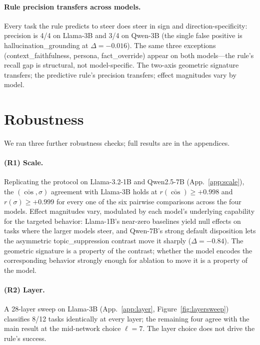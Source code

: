 \documentclass{article}
\begin{document}
\paragraph{Rule precision transfers across models.}
Every task the rule predicts to steer does steer in sign and
direction-specificity: precision is 4/4 on Llama-3B and 3/4 on
Qwen-3B (the single false positive is hallucination\_grounding at
$\Delta = -0.016$). The same three exceptions
(context\_faithfulness, persona, fact\_override) appear on both
models---the rule's recall gap is structural, not model-specific.
The two-axis geometric signature transfers; the predictive rule's
precision transfers; effect magnitudes vary by model.

\section{Robustness}
\label{sec:robustness}

We ran three further robustness checks; full results are in the
appendices.

\paragraph{(R1) Scale.}
Replicating the protocol on Llama-3.2-1B and Qwen2.5-7B
(App.~\ref{app:scale}), the $(\bar{\cos}, \sigma)$ agreement with
Llama-3B holds at $r(\bar{\cos}) \geq +0.998$ and
$r(\sigma) \geq +0.999$ for every one of the six pairwise
comparisons across the four models. Effect magnitudes vary,
modulated by each model's underlying capability for the targeted
behavior: Llama-1B's near-zero baselines yield null effects on
tasks where the larger models steer, and Qwen-7B's strong default
disposition lets the asymmetric topic\_suppression contrast move it
sharply ($\Delta = -0.84$). The geometric signature is a property
of the contrast; whether the model encodes the corresponding
behavior strongly enough for ablation to move it is a property of
the model.

\paragraph{(R2) Layer.}
A 28-layer sweep on Llama-3B (App.~\ref{app:layer},
Figure~\ref{fig:layersweep}) classifies 8/12 tasks identically at
every layer; the remaining four agree with the main result at the
mid-network choice $\ell=7$. The layer choice does not drive the
rule's success.
\end{document}
